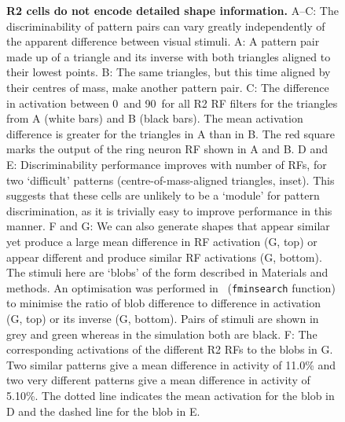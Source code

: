 \begin{figure}[htp]
	\caption{
		{\bf R2 cells do not encode detailed shape information.}
		A--C: The discriminability of pattern pairs can vary greatly independently of the apparent difference between visual stimuli.
		A: A pattern pair made up of a triangle and its inverse with both triangles aligned to their lowest points.
		B: The same triangles, but this time aligned by their centres of mass, make another pattern pair.
		C: The difference in activation between 0\degree\ and 90\degree\ for all R2 \ac{RF} filters for the triangles from A (white bars) and B (black bars). The mean activation difference is greater for the triangles in A than in B. The red square marks the output of the ring neuron \ac{RF} shown in A and B.
		D and E: Discriminability performance improves with number of RFs, for two `difficult' patterns (centre-of-mass-aligned triangles, inset). This suggests that these cells are unlikely to be a `module' for pattern discrimination, as it is trivially easy to improve performance in this manner.
		F and G: We can also generate shapes that appear similar yet produce a large mean difference in \ac{RF} activation (G, top) or appear different and produce similar \ac{RF} activations (G, bottom). The stimuli here are `blobs' of the form described in Materials and methods. An optimisation was performed in \Matlab\ (\texttt{fminsearch} function) to minimise the ratio of blob difference to difference in activation (G, top) or its inverse (G, bottom). Pairs of stimuli are shown in grey and green whereas in the simulation both are black.
		F: The corresponding activations of the different R2 \acp{RF} to the blobs in G. Two similar patterns give a mean difference in activity of 11.0\% and two very different patterns give a mean difference in activity of 5.10\%. The dotted line indicates the mean activation for the blob in D and the dashed line for the blob in E.
	}
	\label{fig:simdiffpatts}
\end{figure}

